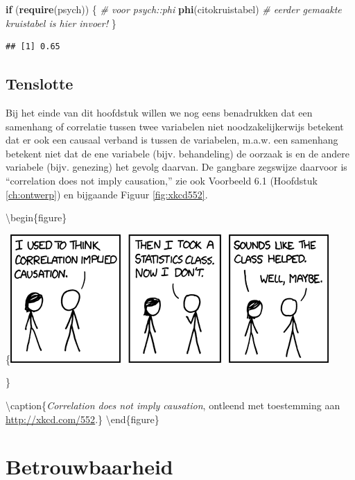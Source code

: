 \documentclass[
]{book}
\newenvironment{Shaded}{\begin{snugshade}}{\end{snugshade}}
\newcommand{\CommentTok}[1]{\textcolor[rgb]{0.56,0.35,0.01}{\textit{#1}}}
\newcommand{\ControlFlowTok}[1]{\textcolor[rgb]{0.13,0.29,0.53}{\textbf{#1}}}
\newcommand{\KeywordTok}[1]{\textcolor[rgb]{0.13,0.29,0.53}{\textbf{#1}}}
\newcommand{\NormalTok}[1]{#1}
\begin{document}
\begin{Shaded}
\begin{Highlighting}[]
\ControlFlowTok{if}\NormalTok{ (}\KeywordTok{require}\NormalTok{(psych)) \{ }\CommentTok{\# voor psych::phi}
  \KeywordTok{phi}\NormalTok{(citokruistabel) }\CommentTok{\# eerder gemaakte kruistabel is hier invoer!}
\NormalTok{\}}
\end{Highlighting}
\end{Shaded}

\begin{verbatim}
## [1] 0.65
\end{verbatim}

\hypertarget{sec:correlationcausation}{%
\section{Tenslotte}\label{sec:correlationcausation}}

Bij het einde van dit hoofdstuk willen we nog eens benadrukken dat een
samenhang of correlatie tussen twee variabelen niet noodzakelijkerwijs
betekent dat er ook een causaal verband is tussen de variabelen, m.a.w.
een samenhang betekent niet dat de ene variabele (bijv. behandeling) de
oorzaak is en de andere variabele (bijv. genezing) het gevolg daarvan.
De gangbare zegswijze daarvoor is ``correlation does not imply
causation,'' zie ook Voorbeeld 6.1 (Hoofdstuk \ref{ch:ontwerp})
en bijgaande Figuur \ref{fig:xkcd552}.

\textbackslash begin\{figure\}

\{\centering \includegraphics{figures/correlation}

\}

\textbackslash caption\{\emph{Correlation does not imply causation}, ontleend met toestemming aan \url{http://xkcd.com/552}.\}\label{fig:xkcd552}
\textbackslash end\{figure\}

\hypertarget{ch:betrouwbaarheid}{%
\chapter{Betrouwbaarheid}\label{ch:betrouwbaarheid}}
\end{document}
